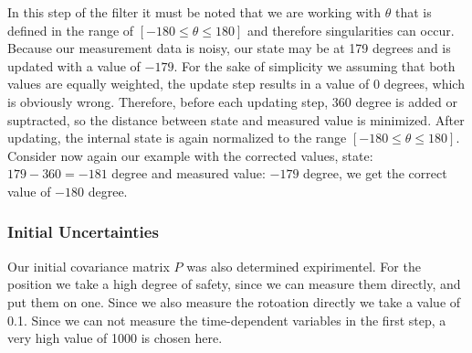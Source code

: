 \documentclass[11pt,oneside,openright]{mpreport}
\begin{document}



In this step of the filter it must be noted that we are working with $\theta$ that is defined in the range of $ [- 180 \le \theta \le 180] $ and therefore singularities can occur.
Because our measurement data is noisy, our state may be at 179 degrees and is updated with a value of $ -179 $. For the sake of simplicity we assuming that both values are equally weighted,
the update step results in a value of 0 degrees, which is obviously wrong. Therefore, before each updating step, $ 360 $ degree is added or suptracted,
so the distance between state and measured value is minimized. After updating, the internal state is again normalized to the range $ [- 180 \le \theta \le 180] $.
Consider now again our example with the corrected values, state: $ 179-360 = -181 $ degree and measured value: $ -179 $ degree, we get the correct value of $ -180 $ degree.


\subsubsection{Initial Uncertainties}

Our initial covariance matrix $ P $ was also determined expirimentel. For the position we take a high degree of safety, since we can measure them directly, and put them on one. 
Since we also measure the rotoation directly we take a value of 0.1. Since we can not measure the time-dependent variables in the first step, a very high value of 1000 is chosen here.
\end{document}
